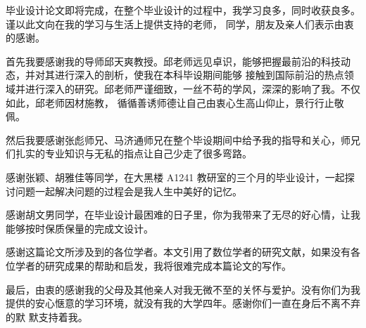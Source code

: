 \cleardoublepage
{}
毕业设计论文即将完成，在整个毕业设计的过程中，我学习良多，同时收获良多。谨以此文向在我的学习与生活上提供支持的老师，
同学，朋友及亲人们表示由衷的感谢。

首先我要感谢我的导师邱天爽教授。邱老师远见卓识，能够把握最前沿的科技动态，并对其进行深入的剖析，使我在本科毕设期间能够
接触到国际前沿的热点领域并进行深入的研究。邱老师严谨细致，一丝不苟的学风，深深的影响了我。不仅如此，邱老师因材施教，
循循善诱师德让自己由衷心生高山仰止，景行行止敬佩。

然后我要感谢张彪师兄、马济通师兄在整个毕设期间中给予我的指导和关心，师兄们扎实的专业知识与无私的指点让自己少走了很多弯路。

感谢张颖、胡雅佳等同学，在大黑楼 A1241 教研室的三个月的毕业设计，一起探讨问题一起解决问题的过程会是我人生中美好的记忆。

感谢胡文男同学，在毕业设计最困难的日子里，你为我带来了无尽的好心情，让我能够按时保质保量的完成文设计。

感谢这篇论文所涉及到的各位学者。本文引用了数位学者的研究文献，如果没有各位学者的研究成果的帮助和启发，我将很难完成本篇论文的写作。

最后，由衷的感谢我的父母及其他亲人对我无微不至的关怀与爱护。没有你们为我提供的安心惬意的学习环境，就没有我的大学四年。感谢你们一直在身后不离不弃的默
默支持着我。
